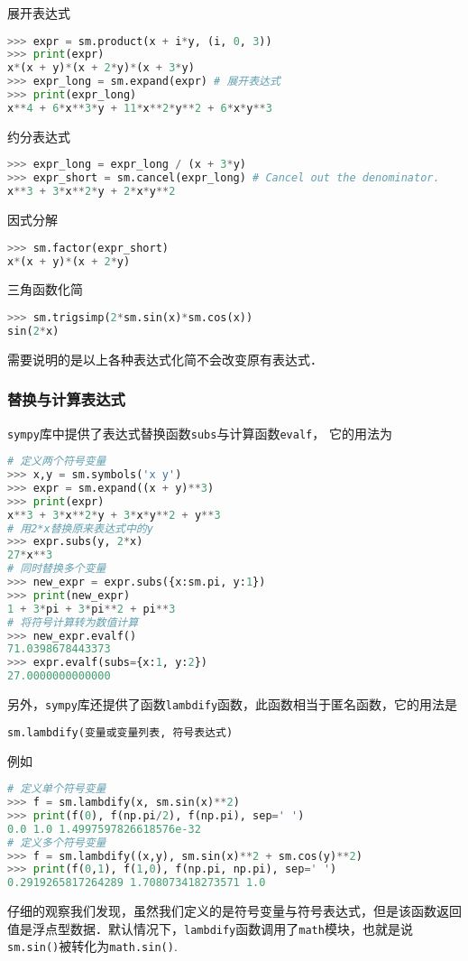 展开表达式
\begin{lstlisting}[language=python]
>>> expr = sm.product(x + i*y, (i, 0, 3))
>>> print(expr)
x*(x + y)*(x + 2*y)*(x + 3*y)
>>> expr_long = sm.expand(expr) # 展开表达式
>>> print(expr_long)
x**4 + 6*x**3*y + 11*x**2*y**2 + 6*x*y**3
\end{lstlisting}

约分表达式
\begin{lstlisting}[language=python]
>>> expr_long = expr_long / (x + 3*y)
>>> expr_short = sm.cancel(expr_long) # Cancel out the denominator.
x**3 + 3*x**2*y + 2*x*y**2
\end{lstlisting}

因式分解
\begin{lstlisting}[language=python]
>>> sm.factor(expr_short) 
x*(x + y)*(x + 2*y)

\end{lstlisting}

三角函数化简
\begin{lstlisting}[language=python]
>>> sm.trigsimp(2*sm.sin(x)*sm.cos(x))
sin(2*x)
\end{lstlisting}
需要说明的是以上各种表达式化简不会改变原有表达式．

\subsubsection{替换与计算表达式}
\verb|sympy|库中提供了表达式替换函数\verb|subs|与计算函数\verb|evalf|， 它的用法为
\begin{lstlisting}[language=python]
# 定义两个符号变量
>>> x,y = sm.symbols('x y')
>>> expr = sm.expand((x + y)**3)
>>> print(expr)
x**3 + 3*x**2*y + 3*x*y**2 + y**3
# 用2*x替换原来表达式中的y
>>> expr.subs(y, 2*x)
27*x**3
# 同时替换多个变量
>>> new_expr = expr.subs({x:sm.pi, y:1})
>>> print(new_expr)
1 + 3*pi + 3*pi**2 + pi**3
# 将符号计算转为数值计算
>>> new_expr.evalf() 
71.0398678443373
>>> expr.evalf(subs={x:1, y:2})
27.0000000000000
\end{lstlisting}
另外，\verb|sympy|库还提供了函数\verb|lambdify|函数，此函数相当于匿名函数，它的用法是
\begin{lstlisting}[language=python]
 sm.lambdify(变量或变量列表, 符号表达式)
\end{lstlisting}
例如
\begin{lstlisting}[language=python]
# 定义单个符号变量
>>> f = sm.lambdify(x, sm.sin(x)**2)
>>> print(f(0), f(np.pi/2), f(np.pi), sep=' ')
0.0 1.0 1.4997597826618576e-32
# 定义多个符号变量
>>> f = sm.lambdify((x,y), sm.sin(x)**2 + sm.cos(y)**2)
>>> print(f(0,1), f(1,0), f(np.pi, np.pi), sep=' ')
0.2919265817264289 1.708073418273571 1.0
\end{lstlisting}
仔细的观察我们发现，虽然我们定义的是符号变量与符号表达式，但是该函数返回值是浮点型数据．默认情况下，\verb|lambdify|函数调用了\verb|math|模块，也就是说\verb|sm.sin()|被转化为\verb|math.sin()|.

